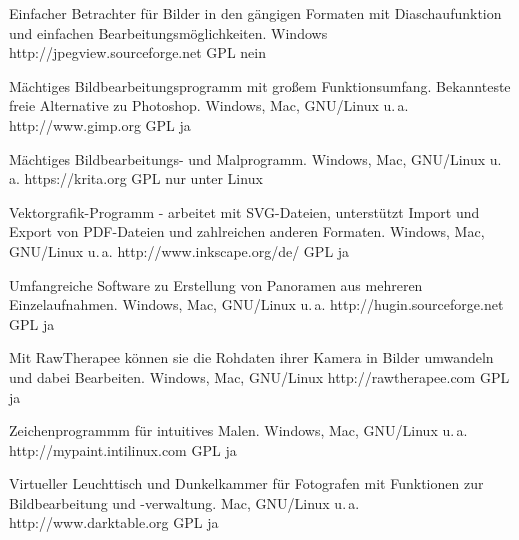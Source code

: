 



{Einfacher Betrachter für Bilder in den gängigen Formaten mit Diaschaufunktion und einfachen Bearbeitungsmöglichkeiten.}
{Windows}
{http://jpegview.sourceforge.net}
{GPL}
{nein}

{Mächtiges Bildbearbeitungsprogramm mit großem Funktionsumfang. Bekannteste freie Alternative zu Photoshop.}
{Windows, Mac, GNU/Linux u.\,a.}
{http://www.gimp.org}
{GPL}
{ja}

{Mächtiges Bildbearbeitungs- und Malprogramm.}
{Windows, Mac, GNU/Linux u.\,a.}
{https://krita.org}
{GPL}
{nur unter Linux}

{Vektorgrafik-Programm - arbeitet mit SVG-Dateien, unterstützt Import und Export von PDF-Dateien und zahlreichen anderen Formaten.}
{Windows, Mac, GNU/Linux u.\,a.}
{http://www.inkscape.org/de/}
{GPL}
{ja}


{Umfangreiche Software zu Erstellung von Panoramen aus mehreren Einzelaufnahmen.}
{Windows, Mac, GNU/Linux u.\,a.}
{http://hugin.sourceforge.net}
{GPL}
{ja}

{Mit RawTherapee können sie die Rohdaten ihrer Kamera in Bilder umwandeln und dabei Bearbeiten.}
{Windows, Mac, GNU/Linux}
{http://rawtherapee.com}
{GPL}
{ja}

{Zeichenprogrammm für intuitives Malen.}
{Windows, Mac, GNU/Linux u.\,a.}
{http://mypaint.intilinux.com}
{GPL}
{ja}

{Virtueller Leuchttisch und Dunkelkammer für Fotografen mit Funktionen zur Bildbearbeitung und -verwaltung.}
{Mac, GNU/Linux u.\,a.}
{http://www.darktable.org}
{GPL}
{ja}

\backpage


